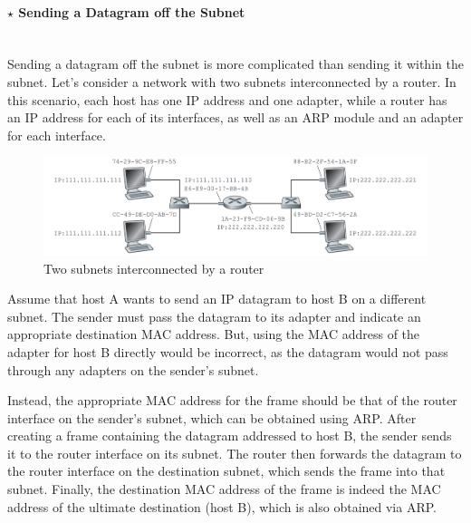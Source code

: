 \clearpage
\paragraph[5.4.1 Sending a Datagram off the Subnet]{$\pmb{\star}$ Sending a Datagram off the Subnet}\mbox{}\\[4pt]
\noindent Sending a datagram off the subnet is more complicated than sending it within the subnet. Let's consider a network with two subnets interconnected by a router. In this scenario, each host has one IP address and one adapter, while a router has an IP address for each of its interfaces, as well as an ARP module and an adapter for each interface.

\begin{figure}[H]
    \centering
    \includegraphics[width = 1\linewidth]{img/5/sending-datagram-two-subnets.png}
    \caption{Two subnets interconnected by a router \cite{Kurose2017}}
    \label{fig:sending-datagram-two-subnets}
\end{figure}

\noindent Assume that host A wants to send an IP datagram to host B on a different subnet. The sender must pass the datagram to its adapter and indicate an appropriate destination MAC address. But, using the MAC address of the adapter for host B directly would be incorrect, as the datagram would not pass through any adapters on the sender's subnet\footnotemark[6].

Instead, the appropriate MAC address for the frame should be that of the router interface on the sender's subnet, which can be obtained using ARP. After creating a frame containing the datagram addressed to host B, the sender sends it to the router interface on its subnet. The router then forwards the datagram to the router interface on the destination subnet, which sends the frame into that subnet. Finally, the destination MAC address of the frame is indeed the MAC address of the ultimate destination (host B), which is also obtained via ARP.

